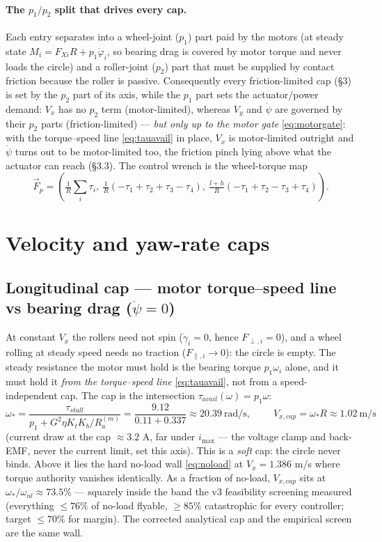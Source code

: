 \documentclass[11pt]{article}
\begin{document}
\paragraph{The $p_1/p_2$ split that drives every cap.} Each entry separates into a wheel-joint
($p_1$) part paid by the motors (at steady state $M_i=F_{Xi}R+p_1\dot\varphi_i$, so bearing drag
is covered by motor torque and never loads the circle) and a roller-joint ($p_2$) part that must
be supplied by contact friction because the roller is passive. Consequently every friction-limited
cap (\S3) is set by the $p_2$ part of its axis, while the $p_1$ part sets the actuator/power
demand: $V_x$ has no $p_2$ term (motor-limited), whereas $V_y$ and $\dot\psi$ are governed
by their $p_2$ parts (friction-limited) --- \emph{but only up to the motor gate}
\eqref{eq:motorgate}: with the torque--speed line \eqref{eq:tauavail} in place, $V_x$ is
motor-limited outright and $\dot\psi$ turns out to be motor-limited too, the friction pinch
lying above what the actuator can reach (\S3.3). The control wrench is the wheel-torque map
\begin{equation}
\vec F_p=\left(\tfrac1R\textstyle\sum_i\tau_i,\ \tfrac1R(-\tau_1+\tau_2+\tau_3-\tau_4),\
\tfrac{l+h}{R}(-\tau_1+\tau_2-\tau_3+\tau_4)\right).
\end{equation}

\section{Velocity and yaw-rate caps}
\subsection{Longitudinal cap --- motor torque--speed line vs bearing drag ($\dot\psi=0$)}
At constant $V_x$ the rollers need not spin ($\dot\gamma_i=0$, hence $F_{\perp,i}=0$), and a wheel
rolling at steady speed needs no traction ($F_{\parallel,i}\to0$): the circle is empty. The steady
resistance the motor must hold is the bearing torque $p_1\omega_i$ alone, and it must hold it
\emph{from the torque--speed line} \eqref{eq:tauavail}, not from a speed-independent cap. The
cap is the intersection $\tau_{avail}(\omega)=p_1\omega$:
\begin{equation}
\omega_*=\frac{\tau_{stall}}{p_1+G^2\eta K_tK_b/R_a^{(m)}}
=\frac{9.12}{0.11+0.337}\approx20.39\ \text{rad/s},
\qquad
\boxed{\;V_{x,cap}=\omega_*R\approx1.02\ \text{m/s}\;}
\label{eq:Vxcap}
\end{equation}
(current draw at the cap $\approx3.2$ A, far under $i_{\max}$ --- the voltage clamp and
back-EMF, never the current limit, set this axis). This is a \emph{soft} cap: the circle never
binds. Above it lies the hard no-load wall \eqref{eq:noload} at $V_x=1.386$ m/s where torque
authority vanishes identically. As a fraction of no-load, $V_{x,cap}$ sits at
$\omega_*/\omega_{nl}\approx73.5\%$ --- squarely inside the band the v3 feasibility screening
measured (everything $\le76\%$ of no-load flyable, $\ge85\%$ catastrophic for every
controller; target $\le70\%$ for margin). The corrected analytical cap and the empirical
screen are the same wall.
\end{document}
